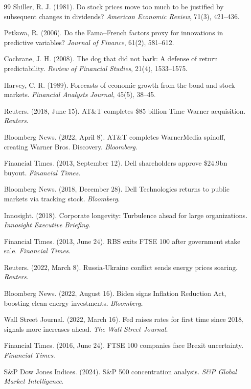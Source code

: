 \documentclass[10pt,a4paper]{article}
\begin{document}
\begin{thebibliography}{99}
Shiller, R. J. (1981). Do stock prices move too much to be justified by subsequent changes in dividends? \textit{American Economic Review}, 71(3), 421--436.

Petkova, R. (2006). Do the Fama--French factors proxy for innovations in predictive variables? \textit{Journal of Finance}, 61(2), 581--612.

Cochrane, J. H. (2008). The dog that did not bark: A defense of return predictability. \textit{Review of Financial Studies}, 21(4), 1533--1575.

Harvey, C. R. (1989). Forecasts of economic growth from the bond and stock markets. \textit{Financial Analysts Journal}, 45(5), 38--45.

Reuters. (2018, June 15). AT\&T completes \$85 billion Time Warner acquisition. \textit{Reuters}.

Bloomberg News. (2022, April 8). AT\&T completes WarnerMedia spinoff, creating Warner Bros. Discovery. \textit{Bloomberg}.

Financial Times. (2013, September 12). Dell shareholders approve \$24.9bn buyout. \textit{Financial Times}.

Bloomberg News. (2018, December 28). Dell Technologies returns to public markets via tracking stock. \textit{Bloomberg}.

Innosight. (2018). Corporate longevity: Turbulence ahead for large organizations. \textit{Innosight Executive Briefing}.

Financial Times. (2013, June 24). RBS exits FTSE 100 after government stake sale. \textit{Financial Times}.

Reuters. (2022, March 8). Russia-Ukraine conflict sends energy prices soaring. \textit{Reuters}.

Bloomberg News. (2022, August 16). Biden signs Inflation Reduction Act, boosting clean energy investments. \textit{Bloomberg}.

Wall Street Journal. (2022, March 16). Fed raises rates for first time since 2018, signals more increases ahead. \textit{The Wall Street Journal}.

Financial Times. (2016, June 24). FTSE 100 companies face Brexit uncertainty. \textit{Financial Times}.

S\&P Dow Jones Indices. (2024). S\&P 500 concentration analysis. \textit{S\&P Global Market Intelligence}.

\end{thebibliography}
\end{document}
